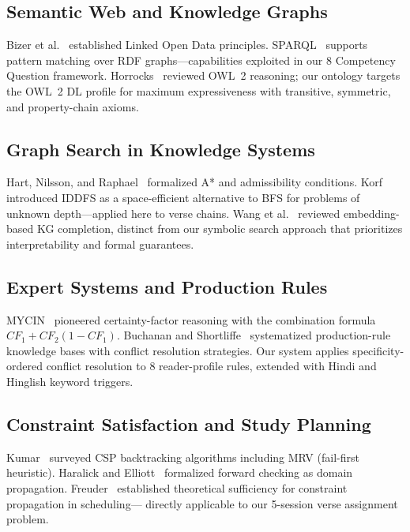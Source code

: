 \documentclass[conference]{IEEEtran}
\begin{document}
\subsection{Semantic Web and Knowledge Graphs}

Bizer et al.~\cite{bizer2009linked} established Linked Open Data principles.
SPARQL~\cite{harris2013sparql} supports pattern matching over RDF
graphs—capabilities exploited in our 8 Competency Question framework.
Horrocks~\cite{horrocks2008ontologies} reviewed OWL~2 reasoning; our
ontology targets the OWL~2 DL profile for maximum expressiveness with
transitive, symmetric, and property-chain axioms.

\subsection{Graph Search in Knowledge Systems}

Hart, Nilsson, and Raphael~\cite{hart1968formal} formalized A* and admissibility
conditions. Korf~\cite{korf1985depth} introduced IDDFS as a space-efficient
alternative to BFS for problems of unknown depth—applied here to verse chains.
Wang et al.~\cite{wang2014knowledge} reviewed embedding-based KG completion,
distinct from our symbolic search approach that prioritizes interpretability
and formal guarantees.

\subsection{Expert Systems and Production Rules}

MYCIN~\cite{shortliffe1976computer} pioneered certainty-factor reasoning with
the combination formula $CF_1 + CF_2(1-CF_1)$. Buchanan and
Shortliffe~\cite{buchanan1984rule} systematized production-rule knowledge bases
with conflict resolution strategies. Our system applies specificity-ordered
conflict resolution to 8 reader-profile rules, extended with Hindi and
Hinglish keyword triggers.

\subsection{Constraint Satisfaction and Study Planning}

Kumar~\cite{kumar1992algorithms} surveyed CSP backtracking algorithms including
MRV (fail-first heuristic). Haralick and Elliott~\cite{haralick1980increasing}
formalized forward checking as domain propagation. Freuder~\cite{freuder1982sufficient}
established theoretical sufficiency for constraint propagation in scheduling—
directly applicable to our 5-session verse assignment problem.
\end{document}
